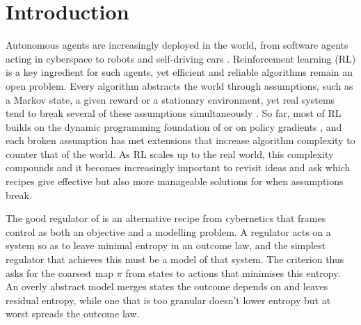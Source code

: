 \section[Introduction]{Introduction}\label{sec:intro}

Autonomous agents are increasingly deployed in the world, from software agents acting in cyberspace \citep{Jimenez-swebench24,Yang-sweagent24,Zhang-cybench25} to robots and self-driving cars \citep{Kober-reinforcement13,Kiran-deep22}.
Reinforcement learning (RL) is a key ingredient for such agents, yet efficient and reliable algorithms remain an open problem.
Every algorithm abstracts the world through assumptions, such as a Markov state, a given reward or a stationary environment, yet real systems tend to break several of these assumptions simultaneously \citep{Dulac-Arnold-challenges21}.
So far, most of RL builds on the dynamic programming foundation of \citet{Bellman-dynamic57} or on policy gradients \citep{Williams-simple92,Sutton-policy00}, and each broken assumption has met extensions that increase algorithm complexity to counter that of the world.
As RL scales up to the real world, this complexity compounds and it becomes increasingly important to revisit ideas and ask which recipes give effective but also more manageable solutions for when assumptions break.


The good regulator of \citet{Conant-good70} is an alternative recipe from cybernetics that frames control as both an objective and a modelling problem.
A regulator acts on a system so as to leave minimal entropy in an outcome law, and the simplest regulator that achieves this must be a model of that system.
The criterion thus asks for the coarsest map $\pi$ from states to actions that minimises this entropy.
An overly abstract model merges states the outcome depends on and leaves residual entropy, while one that is too granular doesn't lower entropy but at worst spreads the outcome law.


